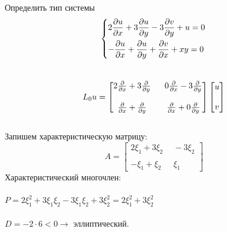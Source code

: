 \documentclass[../main.tex]{subfiles}
\begin{document}
\begin{example}
    Определить тип системы
    $$
    \begin{dcases}
    2\frac{\partial u}{\partial x} + 3\frac{\partial u}{\partial y}-3\frac{\partial v}{\partial y}+u=0 \\
    -\frac{\partial u}{\partial x} + \frac{\partial u}{\partial y}+\frac{\partial v}{\partial x}+xy=0
    \end{dcases} \\ 
    $$ \\ 
    $$L_{0}u = \begin{bmatrix}
    2\frac{\partial }{\partial x}+3\frac{\partial }{\partial y} \ & \ 0\frac{\partial }{\partial x}-3\frac{\partial }{\partial y} \\\\
    \frac{\partial }{\partial x}+\frac{\partial }{\partial y}\ & \ \frac{\partial }{\partial x} + 0\frac{\partial }{\partial y} 
    \end{bmatrix}\begin{bmatrix}
    u \\\\ v
    \end{bmatrix}$$ \\
    Запишем характеристическую матрицу:
    $$A = \begin{bmatrix}
    2\xi_1+3\xi_2 \ & \ -3\xi_2 \\ \\
    -\xi_1 + \xi_2 \  & \ \xi_1 
    \end{bmatrix}$$
    Характеристический многочлен:\\ \\
    $P = 2\xi_1^2 + 3\xi_1\xi_2-3\xi_1\xi_2+3\xi_2^2=2\xi_1^2+3\xi_2^2$ \\ \\
    $D = -2\cdot6<0\rightarrow $ эллиптический.
\end{example}
\end{document}
